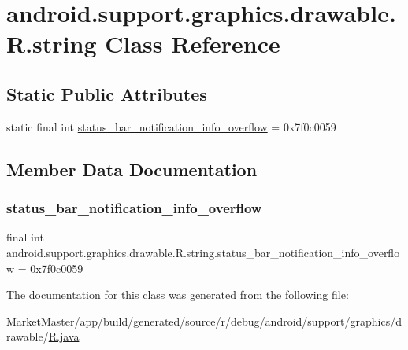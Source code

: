 \hypertarget{classandroid_1_1support_1_1graphics_1_1drawable_1_1R_1_1string}{}\section{android.\+support.\+graphics.\+drawable.\+R.\+string Class Reference}
\label{classandroid_1_1support_1_1graphics_1_1drawable_1_1R_1_1string}
\subsection*{Static Public Attributes}
\begin{DoxyCompactItemize}
\item 
static final int \mbox{\hyperlink{classandroid_1_1support_1_1graphics_1_1drawable_1_1R_1_1string_afa1adb5f8eacaefd685b9cfa844e77de}{status\+\_\+bar\+\_\+notification\+\_\+info\+\_\+overflow}} = 0x7f0c0059
\end{DoxyCompactItemize}


\subsection{Member Data Documentation}
\mbox{\label{classandroid_1_1support_1_1graphics_1_1drawable_1_1R_1_1string_afa1adb5f8eacaefd685b9cfa844e77de}} 
\subsubsection{\texorpdfstring{status\+\_\+bar\+\_\+notification\+\_\+info\+\_\+overflow}{status\_bar\_notification\_info\_overflow}}
{\footnotesize\ttfamily final int android.\+support.\+graphics.\+drawable.\+R.\+string.\+status\+\_\+bar\+\_\+notification\+\_\+info\+\_\+overflow = 0x7f0c0059\hspace{0.3cm}{\ttfamily [static]}}



The documentation for this class was generated from the following file\+:\begin{DoxyCompactItemize}
\item 
Market\+Master/app/build/generated/source/r/debug/android/support/graphics/drawable/\mbox{\hyperlink{debug_2android_2support_2graphics_2drawable_2R_8java}{R.\+java}}\end{DoxyCompactItemize}
